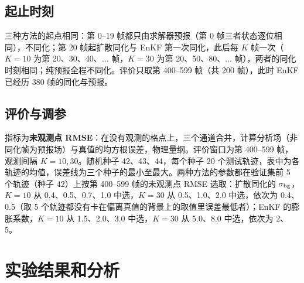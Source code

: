 \documentclass[10.5pt,a4paper]{article}
\begin{document}
\subsection{起止时刻}
三种方法的起点相同：第 0--19 帧都只由求解器预报（第 0 帧三者状态逐位相同），不同化；第 20 帧起扩散同化与 EnKF 第一次同化，此后每 $K$ 帧一次（$K=10$ 为第 20、30、40、$\dots$ 帧，$K=30$ 为第 20、50、80、$\dots$ 帧），两者的同化时刻相同；纯预报全程不同化。评价只取第 400--599 帧（共 200 帧），此时 EnKF 已经历 380 帧的同化与预报。

\subsection{评价与调参}
指标为\textbf{未观测点 RMSE}：在没有观测的格点上，三个通道合并，计算分析场（非同化帧为预报场）与真值的均方根误差，物理量纲。评价窗口为第 400--599 帧，观测间隔 $K=10,30$。随机种子 42、43、44，每个种子 20 个测试轨迹，表中为各轨迹的均值，误差线为三个种子的最小至最大。两种方法的参数都在验证集前 5 个轨迹（种子 42）上按第 400--599 帧的未观测点 RMSE 选取：扩散同化的 $\sigma_{\rm bg}$，$K=10$ 从 0.4、0.5、0.7、1.0 中选，$K=30$ 从 0.5、1.0、2.0 中选，依次为 0.4、0.5（取 5 个轨迹都没有卡在偏离真值的背景上的取值里误差最低者）；EnKF 的膨胀系数，$K=10$ 从 1.5、2.0、3.0 中选，$K=30$ 从 5.0、8.0 中选，依次为 2、5。

\section{实验结果和分析}
\end{document}
